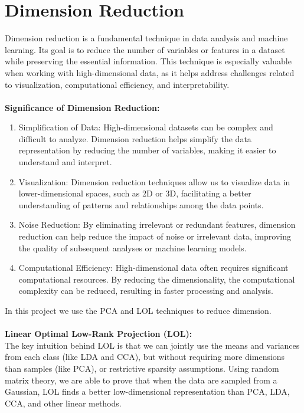 \documentclass{template}
\begin{document}
\section{Dimension Reduction}
Dimension reduction is a fundamental technique in data analysis and machine learning. Its goal is to reduce the number of variables or features in a dataset while preserving the essential information. This technique is especially valuable when working with high-dimensional data, as it helps address challenges related to visualization, computational efficiency, and interpretability.
\\\\
\textbf{Significance of Dimension Reduction:}
\begin{enumerate}
  \item Simplification of Data: High-dimensional datasets can be complex and difficult to analyze. Dimension reduction helps simplify the data representation by reducing the number of variables, making it easier to understand and interpret.
  \item Visualization: Dimension reduction techniques allow us to visualize data in lower-dimensional spaces, such as 2D or 3D, facilitating a better understanding of patterns and relationships among the data points.
  \item Noise Reduction: By eliminating irrelevant or redundant features, dimension reduction can help reduce the impact of noise or irrelevant data, improving the quality of subsequent analyses or machine learning models.
  \item Computational Efficiency: High-dimensional data often requires significant computational resources. By reducing the dimensionality, the computational complexity can be reduced, resulting in faster processing and analysis.
\end{enumerate}
In this project we use the PCA and LOL techniques to reduce dimension.\\\\
\textbf{Linear Optimal Low-Rank Projection (LOL):}\\
The key intuition behind LOL is that we can jointly use the means and variances from each class (like LDA and CCA), but without requiring more dimensions than samples (like PCA), or restrictive sparsity assumptions. Using random matrix theory, we are able to prove that when the data are sampled from a Gaussian, LOL finds a better low-dimensional representation than PCA, LDA, CCA, and other linear methods.\\\\
\end{document}
